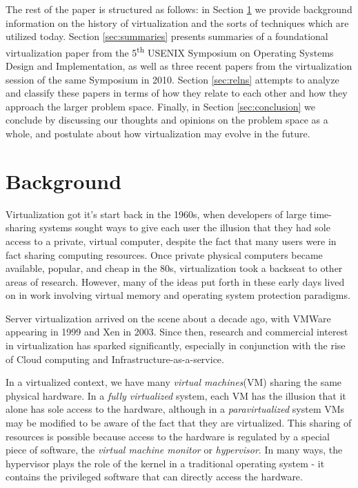 \documentclass[letterpaper, twocolumn]{article}
\begin{document}
The rest of the paper is structured as follows: in Section \ref{sec:background}
we provide background information on the history of virtualization and the
sorts of techniques which are utilized today.  Section \ref{sec:summaries}
presents summaries of a foundational virtualization paper from the
5\textsuperscript{th} USENIX Symposium on Operating Systems Design
and Implementation, as well as three recent papers from the virtualization
session of the same Symposium in 2010.  Section \ref{sec:relns} attempts
to analyze and classify these papers in terms of how they
relate to each other and how they approach the larger problem space.
Finally, in Section \ref{sec:conclusion} we conclude by discussing our
thoughts and opinions on the problem space as a whole, and postulate
about how virtualization may evolve in the future.

\section{Background}
\label{sec:background}

Virtualization got it's start back in the 1960s, when developers
of large time-sharing systems sought ways to give each user the illusion that
they had sole access to a private, virtual computer, despite the fact that
many users were in fact sharing computing resources.  Once private physical
computers became available, popular, and cheap in the 80s, virtualization
took a backseat to other areas of research.  However, many of the ideas
put forth in these early days lived on in work involving virtual memory
and operating system protection paradigms.

Server virtualization arrived on the scene about a decade ago, with VMWare
appearing in 1999 and Xen in 2003.  Since then, research and commercial interest
in virtualization has sparked significantly, especially in conjunction
with the rise of Cloud computing and Infrastructure-as-a-service.

In a virtualized context, we have many \emph{virtual machines}(VM) sharing the same
physical hardware.  In a \emph{fully virtualized} system, each VM has the illusion
that it alone has sole access to the hardware, although in a \emph{paravirtualized}
system VMs may be modified to be aware of the fact that they are virtualized.  This
sharing of resources is possible because access to the hardware is regulated by
a special piece of software, the \emph{virtual machine monitor} or \emph{hypervisor}.
In many ways, the hypervisor plays the role of the kernel in a traditional operating
system - it contains the privileged software that can directly access the hardware.
\end{document}
